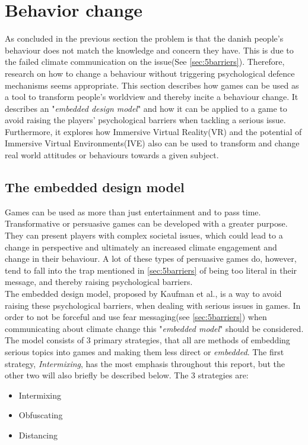         
\section{Behavior change}
    As concluded in the previous section the problem is that the danish people's behaviour does not match the knowledge and concern they have. This is due to the failed climate communication on the issue(See \autoref{sec:5barriers}). Therefore, research on how to change a behaviour without triggering psychological defence mechanisms seems appropriate.
    This section describes how games can be used as a tool to transform people's worldview and thereby incite a behaviour change. It describes an "\textit{embedded design model}" and how it can be applied to a game to avoid raising the players' psychological barriers when tackling a serious issue. 
    Furthermore, it explores how Immersive Virtual Reality(VR) and the potential of Immersive Virtual Environments(IVE) also can be used to transform and change real world attitudes or behaviours towards a given subject.
    
   \subsection{The embedded design model}
    Games can be used as more than just entertainment and to pass time. Transformative or persuasive games can be developed with a greater purpose\cite{transformationalFramework}. They can present players with complex societal issues, which could lead to a change in perspective and ultimately an increased climate engagement and change in their behaviour\cite{persuasiveGameplay}. A lot of these types of persuasive games do, however, tend to fall into the trap mentioned in \autoref{sec:5barriers} of being too literal in their message, and thereby raising psychological barriers\cite{embeddedDesignModel}.\\
    
    The embedded design model, proposed by Kaufman et al., is a way to avoid raising these psychological barriers, when dealing with serious issues in games\cite{embeddedDesignModel}. In order to not be forceful and use fear messaging(see \autoref{sec:5barriers}) when communicating about climate change this "\textit{embedded model}" should be considered\cite{embeddedDesignModel}. The model consists of 3 primary strategies, that all are methods of embedding serious topics into games and making them less direct or \textit{embedded}. The first strategy, \textit{Intermixing}, has the most emphasis throughout this report, but the other two will also briefly be described below. The 3 strategies are:
    \begin{itemize}
        \item Intermixing
        \item Obfuscating
        \item Distancing\\
    \end{itemize}
    

